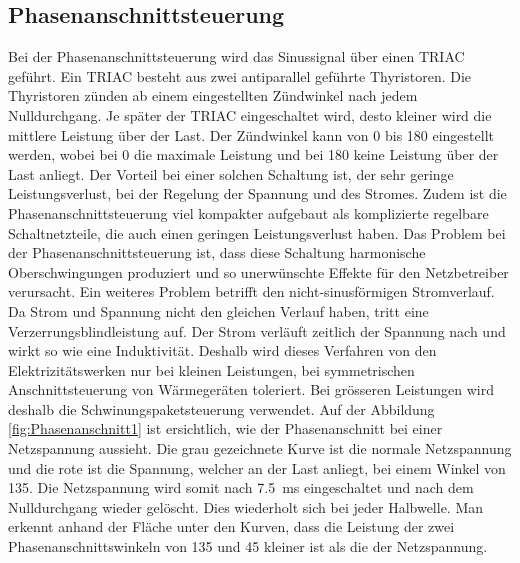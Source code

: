 \subsection{Phasenanschnittsteuerung}\label{sec:Phasenanschnittsteuerung}
Bei der Phasenanschnittsteuerung wird das Sinussignal über einen TRIAC geführt. Ein TRIAC besteht aus zwei antiparallel geführte Thyristoren. Die Thyristoren zünden ab einem eingestellten Zündwinkel nach jedem Nulldurchgang. Je später der TRIAC eingeschaltet wird, desto kleiner wird die mittlere Leistung über der Last. Der Zündwinkel kann von 0\textdegree \hspace{0.02cm} bis 180\textdegree \hspace{0.02cm} eingestellt werden, wobei bei 0\textdegree \hspace{0.02cm} die maximale Leistung und bei 180\textdegree \hspace{0.02cm} keine Leistung über der Last anliegt. Der Vorteil bei einer solchen Schaltung ist, der sehr geringe Leistungsverlust, bei der Regelung der Spannung und des Stromes. Zudem ist die Phasenanschnittsteuerung viel kompakter aufgebaut als komplizierte regelbare Schaltnetzteile, die auch einen geringen Leistungsverlust haben.
Das Problem bei der Phasenanschnittsteuerung ist, dass diese Schaltung harmonische Oberschwingungen produziert und so unerwünschte Effekte für den Netzbetreiber verursacht. Ein weiteres Problem betrifft den nicht-sinusförmigen Stromverlauf. Da Strom und Spannung nicht den gleichen Verlauf haben, tritt eine Verzerrungsblindleistung auf. Der Strom verläuft zeitlich der Spannung nach und wirkt so wie eine Induktivität. Deshalb wird dieses Verfahren von den Elektrizitätswerken nur bei kleinen Leistungen, bei symmetrischen Anschnittsteuerung von Wärmegeräten toleriert. Bei grösseren Leistungen wird deshalb die Schwinungspaketsteuerung verwendet. Auf der Abbildung \ref{fig:Phasenanschnitt1} ist ersichtlich, wie der Phasenanschnitt bei einer Netzspannung aussieht. Die grau gezeichnete Kurve ist die normale Netzspannung und die rote ist die Spannung, welcher an der Last anliegt, bei einem Winkel von 135\textdegree\hspace{0.02cm}. Die Netzspannung wird somit nach \SI{7.5}{ms} eingeschaltet und nach dem Nulldurchgang wieder gelöscht. Dies wiederholt sich bei jeder Halbwelle. Man erkennt anhand der Fläche unter den Kurven, dass die Leistung der zwei Phasenanschnittswinkeln von 135\textdegree\hspace{0.02cm} und 45\textdegree\hspace{0.02cm} kleiner ist als die der Netzspannung. 

